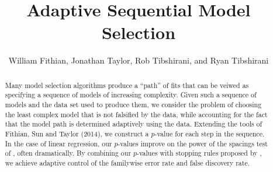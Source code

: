 \documentclass{article}
\begin{document}
\newtheorem{theorem}{Theorem}
\newtheorem{corollary}[theorem]{Corollary}
\newtheorem{lemma}[theorem]{Lemma}
\newtheorem{observation}[theorem]{Observation}
\newtheorem{proposition}[theorem]{Proposition}
\newtheorem{definition}[theorem]{Definition}
\newtheorem{claim}[theorem]{Claim}
\newtheorem{fact}[theorem]{Fact}
\newtheorem{assumption}[theorem]{Assumption}
\newtheorem{model}[theorem]{Model}

\theoremstyle{definition}
\newtheorem{example}{Example}

\newcommand{\cM}{\mathcal{M}}
\newcommand{\cH}{\mathcal{H}}
\newcommand{\cD}{\mathcal{D}}
\newcommand{\FDR}{\textnormal{FDR}}
\newcommand{\FCR}{\textnormal{FCR}}
\newcommand{\crt}{\phi}
\newcommand{\M}{\mathcal{M}}
\newcommand{\cY}{\mathcal{Y}}
\newcommand{\cX}{\mathcal{X}}
\newcommand{\cV}{\mathcal{V}}
\newcommand{\bX}{\mathbf{X}}
\newcommand{\x}{\mathbf{x}}
\newcommand{\Gv}{\;\;\big|\;\;}
\newcommand{\proj}{\cP}
\newcommand{\pow}{\text{Pow}}
\newcommand{\sF}{\mathscr{F}}
\newcommand{\cF}{\mathcal{F}}
\newcommand{\sC}{\mathscr{C}}
\newcommand{\hJ}{\widehat{J}}
\newcommand{\bH}{\mathbf{H}}
\newcommand{\bM}{\mathbf{M}}
\newcommand{\tM}{\widetilde{M}}
\newcommand{\tE}{\widetilde{E}}
\newcommand{\tV}{\widetilde{V}}
\newcommand{\tR}{\widetilde{R}}
\newcommand{\tL}{\widetilde{L}}
\newcommand{\hk}{\hat{k}}
\newcommand{\hr}{\hat{r}}
\newcommand{\cN}{\mathcal{N}}
\newcommand{\leqAS}{\overset{\textrm{a.s.}}{\leq}}


\newcommand*\mystrut{\vrule width0pt height0pt depth1.5ex\relax}
\newcommand{\underlabel}{\underbracket[1pt][.5pt]{\mystrut \quad\;\; \sub \quad\;\; }}
\newcommand{\JTcomment}[1]{{\color{blue}{(JT: \bf \sc #1) }}}
\newcommand{\WFcomment}[1]{{\color{red}{(WF: \bf \sc #1) }}}

\title{Adaptive Sequential Model Selection}
\author{William Fithian, Jonathan Taylor, Rob Tibshirani, and Ryan Tibshirani}
\maketitle

\begin{abstract}
  Many model selection algorithms produce a ``path'' of fits that can be veiwed as specifying a sequence of models of increasing complexity. Given such a sequence of models and the data set used to produce them, we consider the problem of choosing the least complex model that is not falsified by the data, while accounting for the fact that the model path is determined adaptively using the data. Extending the tools of Fithian, Sun and Taylor (2014), we construct a $p$-value for each step in the sequence. In the case of linear regression, our $p$-values improve on the power of the spacings test of \citet{taylor2014exact}, often dramatically. By combining our $p$-values with stopping rules proposed by \citet{gsell2013sequential}, we achieve adaptive control of the familywise error rate and false discovery rate.
\end{abstract}
\end{document}
